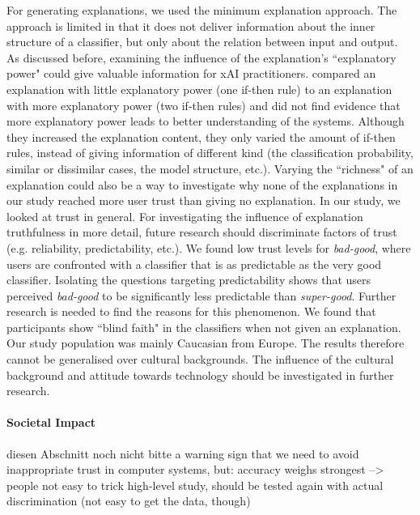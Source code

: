 For generating explanations, we used the minimum explanation approach. The approach is limited in that it does not deliver information about the inner structure of a classifier, but only about the relation between input and output. As discussed before, examining the influence of the explanation's ``explanatory power" could give valuable information for xAI practitioners. \cite{ribeiro2018anchors} compared an explanation with little explanatory power (one if-then rule) to an explanation with more explanatory power (two if-then rules) and did not find evidence that more explanatory power leads to better understanding of the systems. Although they increased the explanation content, they only varied the amount of if-then rules, instead of giving information of different kind (the classification probability, similar or dissimilar cases, the model structure, etc.). Varying the ``richness" of an explanation could also be a way to investigate why none of the explanations in our study reached more user trust than giving no explanation.\newline
In our study, we looked at trust in general. For investigating the influence of explanation truthfulness in more detail, future research should discriminate factors of trust (e.g. reliability, predictability, etc.). We found low trust levels for \textit{bad-good}, where users are confronted with a classifier that is as predictable as the very good classifier. Isolating the questions targeting predictability shows that users perceived \textit{bad-good} to be significantly less predictable than \textit{super-good}. Further research is needed to find the reasons for this phenomenon.\newline
We found that participants show ``blind faith" in the classifiers when not given an explanation. Our study population was mainly Caucasian from Europe. The results therefore cannot be generalised over cultural backgrounds. The influence of the cultural background and attitude towards technology should be investigated in further research.
\paragraph{Societal Impact}
{\color{blue} diesen Abschnitt noch nicht bitte
a warning sign that we need to avoid inappropriate trust in computer systems, but:
accuracy weighs strongest --> people not easy to trick
high-level study, should be tested again with actual discrimination (not easy to get the data, though)
}